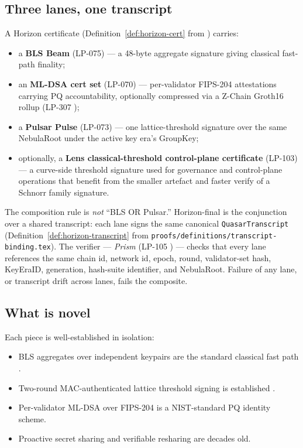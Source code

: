 \subsection{Three lanes, one transcript}

A Horizon certificate (Definition~\ref{def:horizon-cert} from \cite{quasarcertsoundness}) carries:

\begin{itemize}[leftmargin=2em,nosep]
  \item a \textbf{BLS Beam} (LP-075) --- a 48-byte aggregate signature giving classical fast-path finality;
  \item an \textbf{ML-DSA cert set} (LP-070) --- per-validator FIPS-204 attestations carrying PQ accountability, optionally compressed via a Z-Chain Groth16 rollup (LP-307 \cite{lp307});
  \item a \textbf{Pulsar Pulse} (LP-073) --- one lattice-threshold signature over the same NebulaRoot under the active key era's GroupKey;
  \item optionally, a \textbf{Lens classical-threshold control-plane certificate} (LP-103) --- a curve-side threshold signature used for governance and control-plane operations that benefit from the smaller artefact and faster verify of a Schnorr family signature.
\end{itemize}

The composition rule is \emph{not} ``BLS OR Pulsar.'' Horizon-final is the conjunction over a shared transcript: each lane signs the same canonical \texttt{QuasarTranscript} (Definition~\ref{def:horizon-transcript} from \texttt{proofs/definitions/transcript-binding.tex}). The verifier --- \emph{Prism} (LP-105 \cite{lp105}) --- checks that every lane references the same chain id, network id, epoch, round, validator-set hash, KeyEraID, generation, hash-suite identifier, and NebulaRoot. Failure of any lane, or transcript drift across lanes, fails the composite.

\subsection{What is novel}

Each piece is well-established in isolation:
\begin{itemize}[leftmargin=2em,nosep]
  \item BLS aggregates over independent keypairs are the standard classical fast path \cite{bls,boneh2001short}.
  \item Two-round MAC-authenticated lattice threshold signing is established \cite{ringtail,thresholdraccoon,hermine}.
  \item Per-validator ML-DSA over FIPS-204 \cite{fips204} is a NIST-standard PQ identity scheme.
  \item Proactive secret sharing \cite{hjky97} and verifiable resharing \cite{desmedtjajodia97,wongwangwing02} are decades old.
\end{itemize}

